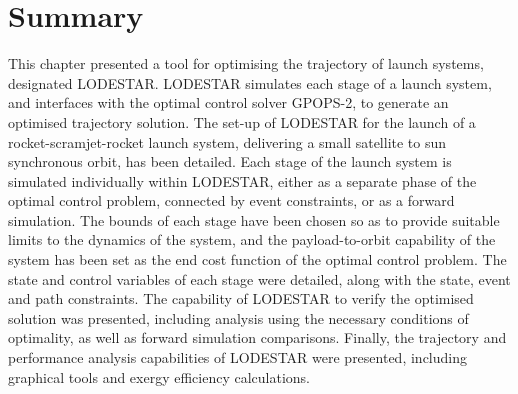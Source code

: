 \section{Summary}
This chapter presented a tool for optimising the trajectory of launch systems, designated LODESTAR. 
LODESTAR simulates each stage of a launch system, and interfaces with the optimal control solver GPOPS-2, to generate an optimised trajectory solution. 
The set-up of LODESTAR for the launch of a rocket-scramjet-rocket launch system, delivering a small satellite to sun synchronous orbit, has been detailed. 
Each stage of the launch system is simulated individually within LODESTAR, either as a separate phase of the optimal control problem, connected by event constraints, or as a forward simulation. 
The bounds of each stage have been chosen so as to provide suitable limits to the dynamics of the system, and the payload-to-orbit capability of the system has been set as the end cost function of the optimal control problem. 
The state and control variables of each stage were detailed, along with the state, event and path constraints.
The capability of LODESTAR to verify the optimised solution was presented, including analysis using the necessary conditions of optimality, as well as forward simulation comparisons.
Finally, the trajectory and performance analysis capabilities of LODESTAR were presented, including graphical tools and exergy efficiency calculations. 
